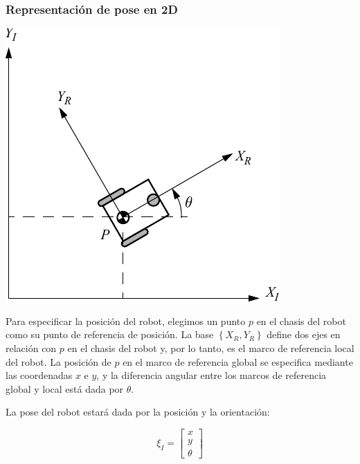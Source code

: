\begin{frame}
    \frametitle{Representación de pose en 2D}
    \footnotesize

    \begin{center}
        \includegraphics[width=0.4\columnwidth]{./images/coordinate_systems.pdf}
    \end{center}




    Para especificar la posición del robot, elegimos un punto $p$ en el chasis del robot como su punto de referencia de posición. La base $\left\lbrace X_R,Y_R \right\rbrace$ define dos ejes en relación con $p$ en el chasis del robot y, por lo tanto, es el marco de referencia local del robot. La posición de $p$ en el marco de referencia global se especifica mediante las coordenadas $x$ e $y$, y la diferencia angular entre los marcos de referencia global y local está dada por $\theta$.

    La pose del robot estará dada por la posición y la orientación:

    \begin{equation*}
        \xi_{I} = \begin{bmatrix}
            x\\
            y\\
            \theta
        \end{bmatrix}
    \end{equation*}
\end{frame}

